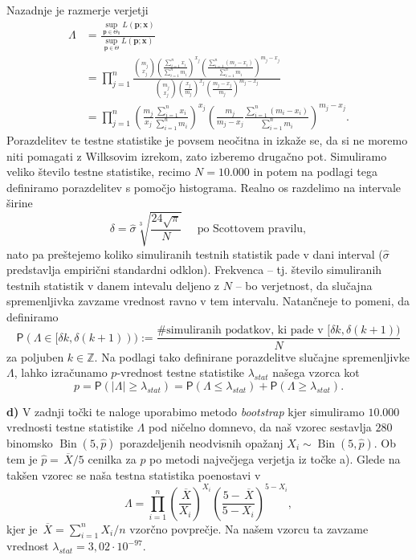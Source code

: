 \documentclass[a4paper,11pt]{article}
\newcommand{\olsi}[1]{\,\overline{\!{#1}}} %
\newcommand{\sumin}{\sum_{i = 1}^n}
\newcommand{\prob}{\mathsf{P}}
\newcommand{\Z}{\mathbb{Z}}
\DeclareMathOperator{\bin}{Bin}
\begin{document}
Nazadnje je razmerje verjetji
\begin{align*}
    \Lambda &= 
    \frac{\sup_{\bm{p} \in \Theta_0} L(\bm{p}; \bm{x})}{\sup_{\bm{p} \in \Theta} L(\bm{p}; \bm{x})}  \\ 
    &= \prod_{j = 1}^n
    \frac{\binom{m_j}{x_j} \left(\frac{\sumin x_i}{\sumin m_i}\right)^{x_j} \left(\frac{\sumin(m_i - x_i)}{\sumin m_i}\right)^{m_j - x_j}}{\binom{m_j}{x_j} \left(\frac{x_j}{m_j}\right)^{x_j} \left(\frac{m_j - x_j}{m_j}\right)^{m_j - x_j}} \\ &= 
    \prod_{j = 1}^n
    \left(\frac{m_j}{x_j} \frac{\sumin x_i}{\sumin m_i}\right)^{x_j}
    \left(\frac{m_j}{m_j - x_j}\frac{\sumin(m_i - x_i)}{\sumin m_i}\right)^{m_j - x_j}.
\end{align*}
Porazdelitev te testne statistike je povsem neočitna in izkaže se, da si ne moremo niti pomagati z Wilksovim izrekom, zato izberemo drugačno pot. Simuliramo veliko število testne statistike, recimo $N = 10.000$ in potem na podlagi tega definiramo porazdelitev s pomočjo histograma. Realno os razdelimo na intervale širine 
\[
    \delta = \hat{\sigma} \sqrt[3]{\frac{24\sqrt{\pi}}{N}} \quad \text{ po Scottovem pravilu},
\]  
nato pa preštejemo koliko simuliranih testnih statistik pade v dani interval ($\hat{\sigma}$ predstavlja empirični standardni odklon).  Frekvenca -- tj. število simuliranih testnih statistik v danem intevalu deljeno z $N$ -- bo verjetnost, da slučajna spremenljivka zavzame vrednost ravno v tem intervalu. Natančneje to pomeni, da definiramo
\[
    \prob(\Lambda \in [\delta k, \delta(k+1))) := \frac{\text{\# simuliranih podatkov, ki pade v $[\delta k, \delta(k+1))$}}{N}
\]
za poljuben $k \in \Z$. Na podlagi tako definirane porazdelitve slučajne spremenljivke $\Lambda$, lahko izračunamo $p$-vrednost testne statistike $\lambda_{stat}$ našega vzorca kot
\[
    p = \prob(\left\lvert \Lambda \right\rvert \geq \lambda_{stat}) = \prob(\Lambda \leq \lambda_{stat}) + \prob(\Lambda \geq \lambda_{stat}). 
\]

\noindent
\textbf{d) } V zadnji točki te naloge uporabimo metodo \emph{bootstrap} kjer simuliramo $10.000$ vrednosti testne statistike $\Lambda$ pod ničelno domnevo, da naš vzorec sestavlja $280$ binomsko $\bin(5, \hat{p})$ porazdeljenih neodvisnih opažanj $X_i \sim \bin(5, \hat{p})$. Ob tem je $\hat{p} = \olsi{X}/5$ cenilka za $p$ po metodi največjega verjetja iz točke a). Glede na takšen vzorec se naša testna statistika poenostavi v 
\[
    \Lambda = \prod_{i = 1}^n \left(\frac{\olsi{X}}{X_i}\right)^{X_i} \left( \frac{5 - \olsi{X}}{5 - X_i}\right)^{5 - X_i},
\]
kjer je $\olsi{X} = \sumin X_i/n$ vzorčno povprečje. Na našem vzorcu ta zavzame vrednost $\lambda_{stat} = 3,02 \cdot 10^{-97}$.
\end{document}
